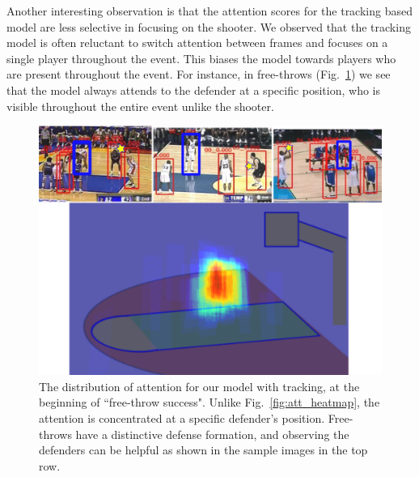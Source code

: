 Another interesting observation
is that the attention scores for the tracking based model are less selective in
focusing on the shooter.  We observed that the tracking model is often
reluctant to switch attention between frames and focuses on a single
player throughout the event. This biases the model towards players who are
present throughout the event. For instance, in free-throws
(Fig.~\ref{fig:visual_attention_trackspec}) we see that the model always
attends to the defender at a specific position, who is visible throughout the
entire event unlike the shooter.

\begin{figure}[ht!]
\begin{center}
   \includegraphics[width=0.9\linewidth]{images/track_spec_output.pdf}
\end{center}
  \vspace{-4mm}
\caption{The distribution of attention for our model with tracking,
     at the beginning of ``free-throw success". Unlike
     Fig.~\ref{fig:att_heatmap}, the attention is concentrated at a specific
     defender's position. Free-throws have a distinctive defense formation, and
   observing the defenders can be helpful as shown in the sample images in
 the top row.} 
  \vspace{-4mm}
\label{fig:visual_attention_trackspec}
\end{figure}


